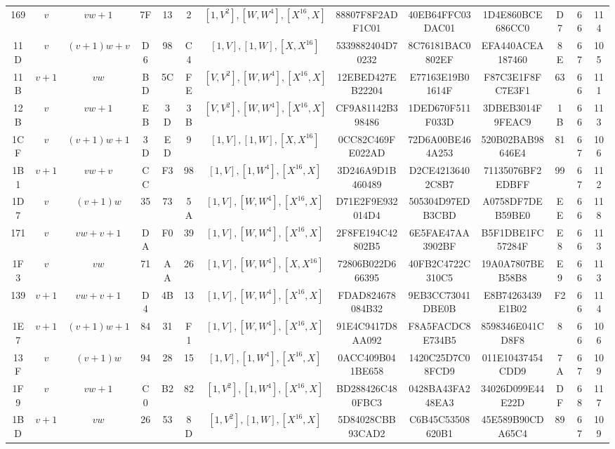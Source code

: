 \begin{table}
\begin{tabular}{|c|c|c|c|c|c|c|c|c|c|c|c|c|}
169 & $v$ & $vw + 1$ & 7F & 13 & 2 & $[1, V^2], [W, W^4], [X^{16}, X]$ & 88807F8F2ADF1C01 & 40EB64FFC03DAC01 & 1D4E860BCE686CC0 & D7 & 66 &  114 \\
11D & $v$ & $(v + 1)w + v$ & D6 & 98 & C4 & $[1, V], [1, W], [X, X^{16}]$ & 5339882404D70232 & 8C76181BAC0802EF & EFA440ACEA187460 & 8E & 67 &  105 \\
11B & $v + 1$ & $vw$ & BD & 5C & FE & $[V, V^2], [W, W^4], [X^{16}, X]$ & 12EBED427EB22204 & E77163E19B01614F & F87C3E1F8FC7E3F1 & 63 & 66 &  111 \\
12B & $v$ & $vw + 1$ & EB & 3D & 3B & $[V, V^2], [W, W^4], [X^{16}, X]$ & CF9A81142B398486 & 1DED670F511F033D & 3DBEB3014F9FEAC9 & 1B & 66 &  113 \\
1CF & $v$ & $(v + 1)w + 1$ & 3D & ED & 9 & $[1, V], [1, W], [X, X^{16}]$ & 0CC82C469FE022AD & 72D6A00BE464A253 & 520B02BAB98646E4 & 81 & 67 &  106 \\
1B1 & $v + 1$ & $vw + v$ & CC & F3 & 98 & $[1, V], [1, W^4], [X^{16}, X]$ & 3D246A9D1B460489 & D2CE42136402C8B7 & 71135076BF2EDBFF & 99 & 67 &  112 \\
1D7 & $v$ & $(v + 1)w$ & 35 & 73 & 5A & $[1, V], [W, W^4], [X^{16}, X]$ & D71E2F9E932014D4 & 505304D97EDB3CBD & A0758DF7DEB59BE0 & EE & 66 &  118 \\
171 & $v$ & $vw + v + 1$ & DA & F0 & 39 & $[1, V], [W, W^4], [X^{16}, X]$ & 2F8FE194C42802B5 & 6E5FAE47AA3902BF & B5F1DBE1FC57284F & E8 & 66 &  113 \\
1F3 & $v$ & $vw$ & 71 & AA & 26 & $[1, V], [W, W^4], [X, X^{16}]$ & 72806B022D666395 & 40FB2C4722C310C5 & 19A0A7807BEB58B8 & E9 & 66 &  113 \\
139 & $v + 1$ & $vw + v + 1$ & D4 & 4B & 13 & $[1, V], [W, W^4], [X^{16}, X]$ & FDAD824678084B32 & 9EB3CC73041DBE0B & E8B74263439E1B02 & F2 & 66 &  114 \\
1E7 & $v + 1$ & $(v + 1)w + 1$ & 84 & 31 & F1 & $[1, V], [W, W^4], [X^{16}, X]$ & 91E4C9417D8AA092 & F8A5FACDC8E734B5 & 8598346E041CD8F8 & 8 & 66 &  106 \\
13F & $v$ & $(v + 1)w$ & 94 & 28 & 15 & $[1, V], [1, W^4], [X^{16}, X]$ & 0ACC409B041BE658 & 1420C25D7C08FCD9 & 011E10437454CDD9 & 7A & 67 &  109 \\
1F9 & $v$ & $vw + 1$ & C0 & B2 & 82 & $[1, V^2], [1, W^4], [X^{16}, X]$ & BD288426C480FBC3 & 0428BA43FA248EA3 & 34026D099E44E22D & DF & 68 &  117 \\
1BD & $v + 1$ & $vw$ & 26 & 53 & 8D & $[1, V^2], [1, W], [X^{16}, X]$ & 5D84028CBB93CAD2 & C6B45C53508620B1 & 45E589B90CDA65C4 & 89 & 67 &  109 \\

\end{tabular}
\end{table}
